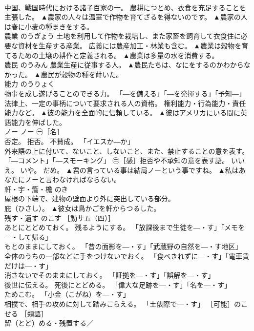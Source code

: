 \documentclass[8pt]{extreport}
\begin{document}
\begin{CJK}{UTF8}{min}
\\	中国、戦国時代における諸子百家の一。 農耕につとめ、衣食を充足することを主張した。	▲農家の人々は温室で作物を育てざるを得ないのです。 ▲農家の人は春に小麦の種まきをする。
\\	農業	のうぎょう	土地を利用して作物を栽培し、また家畜を飼育して衣食住に必要な資材を生産する産業。 広義には農産加工・林業も含む。	▲農業は穀物を育てるための土壌の耕作と定義される。 ▲農業は多量の水を消費する。
\\	農民	のうみん	農業生産に従事する人。	▲農民たちは、なにをするのかわからなかった。 ▲農民が穀物の種を蒔いた。
\\	能力	のうりょく	
\\	物事を成し遂げることのできる力。 「―を備える」「―を発揮する」「予知―」 
\\	法律上、一定の事柄について要求される人の資格。 権利能力・行為能力・責任能力など。	▲彼の能力を全面的に信頼している。 ▲彼はアメリカにいる間に英語能力を伸ばした。
\\	ノー	ノー	㊀［名］ 
\\	否定。 拒否。 不賛成。 「イエスか―か」 
\\	外来語の上に付いて、ないこと、しないこと、また、禁止することの意を表す。 「―コメント」「―スモーキング」 ㊁［感］拒否や不承知の意を表す語。 いいえ。 いや。 だめ。	▲君の言っている事は結局ノーという事ですね。 ▲私はあなたにノーと言わなければならない。
\\	軒・宇・簷・檐	のき	
\\	屋根の下端で、建物の壁面より外に突出している部分。 
\\	庇（ひさし）。	▲彼女は鳥かごを軒からつるした。
\\	残す・遺す	のこす	［動サ五（四）］ 
\\	あとにとどめておく。 残るようにする。 「放課後まで生徒を―・す」「メモを―・して帰る」 
\\	もとのままにしておく。 「昔の面影を―・す」「武蔵野の自然を―・す地区」 
\\	全体のうちの一部などに手をつけないでおく。 「食べきれずに―・す」「電車賃だけは―・す」 
\\	消さないでそのままにしておく。 「証拠を―・す」「誤解を―・す」 
\\	後世に伝える。 死後にとどめる。 「偉大な足跡を―・す」「名を―・す」 
\\	ためこむ。 「小金（こがね）を―・す」 
\\	相撲で、相手の攻めに対して踏みこらえる。 「土俵際で―・す」 ［可能］のこせる ［類語］
\\	留（とど）める・残置する／

\end{CJK}
\end{document}

